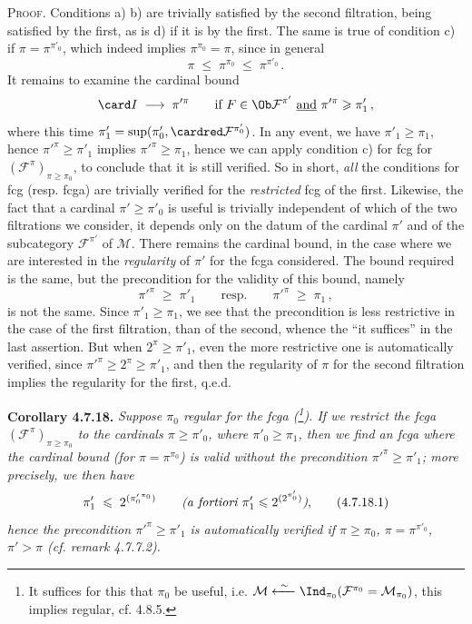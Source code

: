 \textsc{Proof}. Conditions a) b) are trivially satisfied by the second filtration, being satisfied by the first, as is d) if it is by the first. The same is true of condition c) if $\pi=\pi^{\pi'_0}$, which indeed implies $\pi^{\pi_0}=\pi$, since in general
\[
\pi \;\leqslant\; \pi^{\pi_0} \;\leqslant\; \pi^{\pi'_0} \, .
\]
It remains to examine the cardinal bound
\[
\card I \;\longrightarrow\; \pi'^{\pi} \qquad \text{if } F\in\Ob\mathcal{F}^{\pi'} \ \underline{\text{and}}\ \pi'^{\pi}\geqslant\pi'_1 \, , %
\]
where this time $\pi'_1=\sup(\pi'_0,\cardred\mathcal{F}^{\pi'_0})$. In any event, we have $\pi'_1\geqslant\pi_1$, hence
$\pi'^{\pi}\geqslant\pi'_1$ implies $\pi'^{\pi}\geqslant\pi_1$, hence we can apply condition c) for fcg for $(\mathcal{F}^{\pi})_{\pi\geqslant\pi_0}$, to conclude that it is still verified. So in short, \textit{all} the conditions for fcg (resp. fcga) are trivially verified for the \textit{restricted} fcg of the first. Likewise, the fact that a cardinal $\pi'\geqslant\pi'_0$ is useful is trivially independent of which of the two filtrations we consider, it depends only on the datum of the cardinal $\pi'$ and of the subcategory $\mathcal{F}^{\pi'}$ of $\mathcal{M}$. There remains the cardinal bound, in the case where we are interested in the \textit{regularity} of $\pi'$ for the fcga considered. The bound required is the same, but the precondition for the validity of this bound, namely
\[
\pi'^{\pi} \;\geqslant\; \pi'_1 \qquad \text{resp.} \qquad \pi'^{\pi} \;\geqslant\; \pi_1 \, ,
\]
is not the same. Since $\pi'_1\geqslant\pi_1$, we see that the precondition is less restrictive in the case of the first filtration, than of the second, whence the ``it suffices'' in the last assertion. But when $2^{\pi}\geqslant\pi'_1$, even the more restrictive one is automatically verified, since $\pi'^{\pi}\geqslant 2^{\pi}\geqslant\pi'_1$, and then the regularity of $\pi$ for the second filtration implies the regularity for the first, q.e.d. %

\noindent{}
\textbf{Corollary 4.7.18.} \textit{Suppose $\pi_0$ regular for the fcga (\footnote[77]{It suffices for this that $\pi_0$ be useful, i.e. $\mathcal{M}\xleftarrow{\ \sim\ }\Ind_{\pi_0}(\mathcal{F}^{\pi_0}=\mathcal{M}_{\pi_0})$, this implies regular, cf. 4.8.5.}). If we restrict the fcga $(\mathcal{F}^{\pi})_{\pi\geqslant\pi_0}$ to the cardinals $\pi\geqslant\pi'_0$, where $\pi'_0\geqslant\pi_1$, then we find an fcga where the cardinal bound (for $\pi=\pi^{\pi_0}$) is valid without the precondition $\pi'^{\pi}\geqslant\pi'_1$; more precisely, we then have}
\[
\pi'_1 \;\leqslant\; 2^{({\pi'_0}^{\pi_0})} \qquad \text{\textit{(a fortiori $\pi'_1\leqslant 2^{(2^{\pi'_0})}$)},} \tag*{(4.7.18.1)}
\]
\textit{hence the precondition $\pi'^{\pi}\geqslant\pi'_1$ is automatically verified if $\pi\geqslant\pi_0$, $\pi=\pi^{\pi'_0}$, $\pi'>\pi$ (cf. remark 4.7.7.2).}

